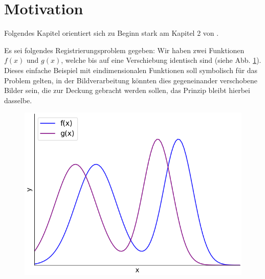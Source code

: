 %
%
%

\section{Motivation
\label{mellin:section:teil1}}

Folgendes Kapitel orientiert sich zu Beginn stark am Kapitel 2 von \cite{mellin:mendezmueller-book}.
\smallskip

Es sei folgendes Registrierungsproblem gegeben: Wir haben zwei Funktionen $f(x)$ und $g(x)$, welche bis auf eine Verschiebung 
identisch sind (siehe Abb. \ref{fig:mellin:f1}). Dieses einfache Beispiel mit eindimensionalen Funktionen soll symbolisch für das Problem 
gelten, in der Bildverarbeitung könnten dies gegeneinander verschobene Bilder sein, die zur Deckung gebracht werden sollen, das Prinzip 
bleibt hierbei dasselbe.
\begin{figure}
    \centering
    \includegraphics[width=.5\textwidth]{papers/mellin/images/f1}
    \caption{}
    \label{fig:mellin:f1}
\end{figure}

